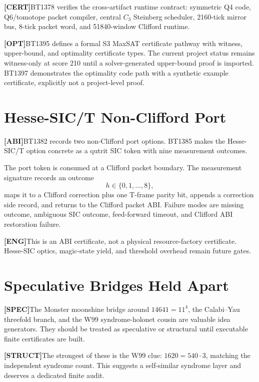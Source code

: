\documentclass[11pt]{article}
\newcommand{\claim}[2]{\noindent\textbf{[#1]}\;#2}
\begin{document}
\claim{CERT}{BT1378 verifies the cross-artifact runtime contract: symmetric Q4 code, Q6/tomotope packet compiler, central \(C_3\) Steinberg scheduler, 2160-tick mirror bus, 8-tick packet word, and 51840-window Clifford runtime.}





\claim{OPT}{BT1395 defines a formal S3 MaxSAT certificate pathway with witness, upper-bound, and optimality certificate types. The current project status remains witness-only at score 210 until a solver-generated upper-bound proof is imported. BT1397 demonstrates the optimality code path with a synthetic example certificate, explicitly not a project-level proof.}

\section{Hesse-SIC/T Non-Clifford Port}

\claim{ABI}{BT1382 records two non-Clifford port options. BT1385 makes the Hesse-SIC/T option concrete as a qutrit SIC token with nine measurement outcomes.}

The port token is consumed at a Clifford packet boundary. The measurement signature records an outcome
\[
h\in\{0,1,\ldots,8\},
\]
maps it to a Clifford correction plus one T-frame parity bit, appends a correction side record, and returns to the Clifford packet ABI. Failure modes are missing outcome, ambiguous SIC outcome, feed-forward timeout, and Clifford ABI restoration failure.

\claim{ENG}{This is an ABI certificate, not a physical resource-factory certificate. Hesse-SIC optics, magic-state yield, and threshold overhead remain future gates.}

\section{Speculative Bridges Held Apart}

\claim{SPEC}{The Monster moonshine bridge around \(14641=11^4\), the Calabi--Yau threefold branch, and the W99 syndrome-holonet cousin are valuable idea generators. They should be treated as speculative or structural until executable finite certificates are built.}

\claim{STRUCT}{The strongest of these is the W99 clue: \(1620=540\cdot3\), matching the independent syndrome count. This suggests a self-similar syndrome layer and deserves a dedicated finite audit.}
\end{document}
